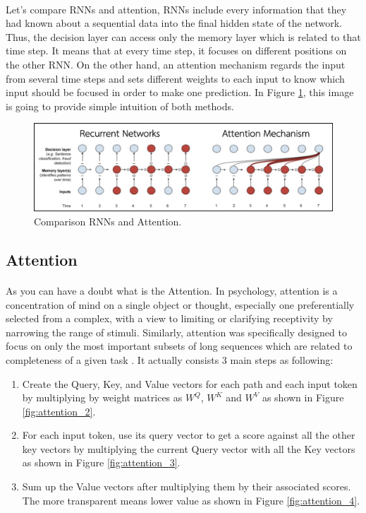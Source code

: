 \paragraph{}
Let’s compare RNNs and attention, RNNs include every information that they had known about a sequential data into the final hidden state of the network. Thus, the decision layer can access only the memory layer which is related to that time step. It means that at every time step, it focuses on different positions on the other RNN. On the other hand, an attention mechanism regards the input from several time steps and sets different weights to each input to know which input should be focused in order to make one prediction. In Figure \ref{fig:rnnvsattention}, this image is going to provide simple intuition of both methods.

\begin{figure}[H]
  \centering
  \caption[Comparison RNNs and Attention.]{Comparison RNNs and Attention.\\\hspace{\textwidth}}\label{fig:rnnvsattention}
  \includegraphics[scale = 0.4
  ]{figures/rnnvsattention.jpg}  
\end{figure}
\subsection{Attention}
\paragraph{}
As you can have a doubt what is the Attention. In psychology, attention is  a concentration of mind on a single object or thought, especially one preferentially selected from a complex, with a view to limiting or clarifying receptivity by narrowing the range of stimuli. Similarly, attention was specifically designed to focus on only the most important subsets of long sequences which are related to completeness of a given task \cite{alammar_2018,alammar_2019,klingenbrunn_2021}. It actually consists 3 main steps as following:
\begin{enumerate}
\item Create the Query, Key, and Value vectors for each path and each input token by multiplying by weight matrices as $W^Q$, $W^K$ and $W^V$ as shown in Figure \ref{fig:attention_2}.
\item For each input token, use its query vector to get a score against all the other key vectors by multiplying the current Query vector with all the Key vectors as shown in Figure \ref{fig:attention_3}.
\item Sum up the Value vectors after multiplying them by their associated scores. The more transparent means lower value as shown in Figure \ref{fig:attention_4}.
\end{enumerate}

